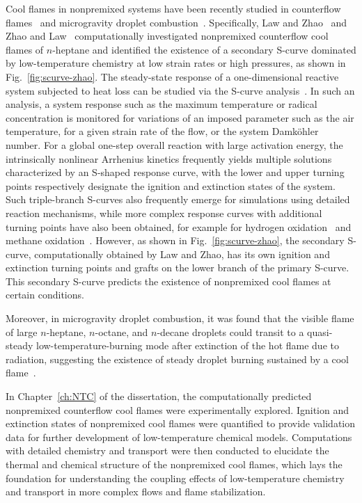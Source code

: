 Cool flames in nonpremixed systems have been recently studied in counterflow flames~\cite{law12,zhao13,won15,ju16} and microgravity droplet combustion~\cite{nayagam12,farouk15,nayagam15}.  Specifically, Law and Zhao~\cite{law12} and Zhao and Law~\cite{zhao13} computationally investigated nonpremixed counterflow cool flames of $n$-heptane and identified the existence of a secondary S-curve dominated by low-temperature chemistry at low strain rates or high pressures, as shown in Fig.~\ref{fig:scurve-zhao}.  The steady-state response of a one-dimensional reactive system subjected to heat loss can be studied via the S-curve analysis~\cite{lawbook}.  In such an analysis, a system response such as the maximum temperature or radical concentration is monitored for variations of an imposed parameter such as the air temperature, for a given strain rate of the flow, or the system Damk\"ohler number.  For a global one-step overall reaction with large activation energy, the intrinsically nonlinear Arrhenius kinetics frequently yields multiple solutions characterized by an S-shaped response curve, with the lower and upper turning points respectively designate the ignition and extinction states of the system.  Such triple-branch S-curves also frequently emerge for simulations using detailed reaction mechanisms, while more complex response curves with additional turning points have also been obtained, for example for hydrogen oxidation~\cite{kreutz94,fotache98} and methane oxidation~\cite{liu09}.  However, as shown in Fig.~\ref{fig:scurve-zhao}, the secondary S-curve, computationally obtained by Law and Zhao, has its own ignition and extinction turning points and grafts on the lower branch of the primary S-curve. This secondary S-curve predicts the existence of  nonpremixed cool flames at certain conditions.    

Moreover, in microgravity droplet combustion, it was found that the visible flame of large $n$-heptane, $n$-octane, and $n$-decane droplets could transit to a quasi-steady low-temperature-burning mode after extinction of the hot flame due to radiation, suggesting the existence of steady droplet burning sustained by a cool flame~\cite{nayagam15}.   

In Chapter~\ref{ch:NTC} of the dissertation, the computationally predicted nonpremixed counterflow cool flames were experimentally explored.  Ignition and extinction states of nonpremixed cool flames were quantified to provide validation data for further development of low-temperature chemical models.  Computations with detailed chemistry and transport were then conducted to elucidate the thermal and chemical structure of the nonpremixed cool flames, which lays the foundation for understanding the coupling effects of low-temperature chemistry and transport in more complex flows and flame stabilization.

